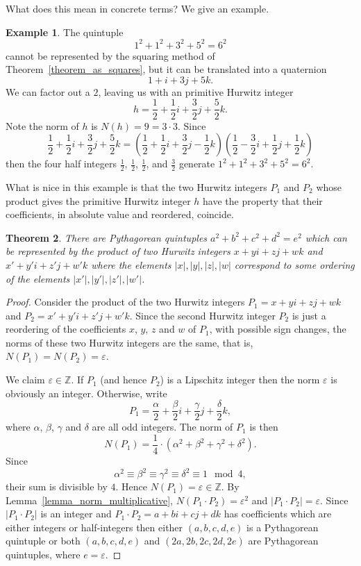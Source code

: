 \documentclass[12pt,table]{article}
\newtheorem{theorem}{Theorem}[section]
\theoremstyle{definition}
\newtheorem{example}[theorem]{Example}
\theoremstyle{remark}
\newcommand{\Zzz}{\mathbb Z}
\numberwithin{equation}{section}
\begin{document}
What does this mean in concrete terms? We give an example.

\begin{example}
{\rm The quintuple 
\[
     1^2+ 1^2+ 3^2+ 5^2= 6^2
\]
cannot be represented by the squaring method
of Theorem~\ref{theorem_as_squares},
but it can be translated into 
a quaternion
\[
      1 + i + 3j + 5k.
\]
We can factor out a $2$, leaving us with an 
primitive Hurwitz integer
\[
     h= \frac{1}{2} + \frac{1}{2}i + \frac{3}{2}j + \frac{5}{2}k.
\]
Note the norm of $h$ is $N(h) = 9 = 3 \cdot 3$.
Since 
\[
\frac{1}{2} + \frac{1}{2}i + \frac{3}{2}j + \frac{5}{2}k
=
\left(\frac{1}{2}+\frac{1}{2}i+\frac{3}{2}j-\frac{1}{2}k\right)
\left(\frac{1}{2}-\frac{3}{2}i+\frac{1}{2}j+\frac{1}{2}k\right) 
\]
then 
the four half integers $\frac{1}{2}$, $\frac{1}{2}$, $\frac{1}{2}$, 
and $\frac{3}{2}$ 
generate $1^2+ 1^2+ 3^2+ 5^2= 6^2$. 
}
\end{example}

What is nice in this example is that the two Hurwitz integers 
$P_1$ and $P_2$ whose
product gives the primitive Hurwitz integer $h$ have the property that
their coefficients, in absolute value and reordered, coincide.

\begin{theorem}
\label{theorem_as_products}
There are Pythagorean quintuples 
$a^2 + b^2 +c^2 +d^2 = e^2$ which can be represented
by the product of two Hurwitz integers
$x + yi + zj + wk$ and
$x' + y'i + z'j + w'k$
where
the elements
$|x|, |y|, |z|, |w|$ correspond
to some ordering of the elements
$|x'|, |y'|, |z'|, |w'|$.
\end{theorem}
\begin{proof}
Consider the product of the two Hurwitz integers
$P_1 = x + yi + zj + wk$ and
$P_2 = x' + y'i + z'j + w'k$.  
Since the second Hurwitz integer $P_2$ 
is just a reordering of
the coefficients $x$, $y$, $z$ and $w$ of $P_1$, 
with possible sign changes,
the norms  of these two Hurwitz integers
are the same, that is,
$N(P_1) = N(P_2) = \varepsilon$.


We claim $\varepsilon \in \Zzz$.  If $P_1$ (and hence $P_2$)
is a Lipschitz integer then 
the norm $\varepsilon$ is obviously an integer.
Otherwise, write 
\[
  P_1 = \frac{\alpha}{2} + \frac{\beta}{2} i + 
        \frac{\gamma}{2} j + \frac{\delta}{2} k,
\]
where
$\alpha$, $\beta$, $\gamma$ and $\delta$ are all odd integers.
The norm of $P_1$ is then
\[
     N(P_1) = \frac{1}{4} \cdot 
              (\alpha^2 + \beta^2 + \gamma^2 + \delta^2).
\]
Since
\[
  \alpha^2 \equiv \beta^2 \equiv \gamma^2 \equiv \delta^2 \equiv 1 \mod 4,
\]
their sum is divisible by $4$.
Hence $N(P_1) = \varepsilon \in \Zzz$.
By Lemma~\ref{lemma_norm_multiplicative},
$N(P_1 \cdot P_2) = \varepsilon^2$
and 
$|P_1 \cdot P_2| = \varepsilon$.
Since $|P_1 \cdot P_2|$ is an integer and 
$P_1 \cdot P_2 = a + bi + cj + dk$ has
coefficients which are either integers or half-integers 
then
either
$(a,b,c,d,e)$ is a Pythagorean quintuple
or
both
$(a,b,c,d,e)$ and
$(2a,2b,2c,2d,2e)$ are Pythagorean quintuples,
where
$e = \varepsilon$.
\end{proof}
\end{document}
